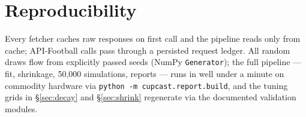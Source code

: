 \documentclass[11pt]{article}
\begin{document}
\section{Reproducibility}
Every fetcher caches raw responses on first call and the pipeline reads only
from cache; API-Football calls pass through a persisted request ledger. All
random draws flow from explicitly passed seeds (NumPy \texttt{Generator}); the
full pipeline --- fit, shrinkage, 50{,}000 simulations, reports --- runs in well
under a minute on commodity hardware via \texttt{python -m cupcast.report.build},
and the tuning grids in \S\ref{sec:decay} and \S\ref{sec:shrink} regenerate via
the documented validation modules.



\end{document}

